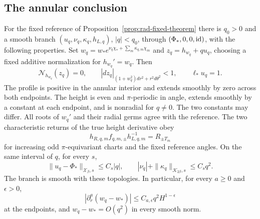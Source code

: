 \subsection{The annular conclusion}

\begin{theorem}
\label{thm:new-annular-height}
For the fixed reference of Proposition~\ref{prop:rad-fixed-theorem}
there is $q_0>0$ and a smooth branch
$(u_q,\nu_q,\kappa_q,h_{L,q})$, $|q|<q_0$, through
$(\Phi_*,0,0,\mathrm{id})$, with the following properties.
Set $w_q=w_*e^{\nu_q\chi_*+\sum_m\kappa_{q,m}\chi_m}$ and
$z_q=h_{w_q}+qu_q$, choosing a fixed additive normalization for
$h_{w_q}'=w_q$. Then
\[
 \mathcal N_{h_{w_q}}(z_q)=0,\qquad
 |dz_q|_{(1+w_q^2)dr^2+r^2d\theta^2}<1,\qquad \ell_*u_q=1.
\]
The profile is positive in the annular interior and extends smoothly
by zero across both endpoints. The height is even and $\pi$-periodic
in angle, extends smoothly by a constant at each endpoint, and is
nonradial for $q\ne0$. The two constants may differ.
All roots of $w_q'$ and their radial germs agree with the reference.
The two characteristic returns of the true height derivative obey
\begin{equation}\label{eq:annular-return-condition}
 h_{R,q,m}f_{q,m,\pm}h_{L,q,m}^{-1}=R_{\pm T_m}
\end{equation}
for increasing odd $\pi$-equivariant charts and the fixed reference angles.
On the same interval of $q$, for every $s$,
\begin{equation}\label{eq:annular-branch-estimates}
 \|u_q-\Phi_*\|_{\mathcal X_\beta,s}\le C_s|q|,\qquad
 |\nu_q|+\|\kappa_q\|_{\mathcal K_{2\beta},s}\le C_sq^2.
\end{equation}
The branch is smooth with these topologies. In particular, for
every $a\ge0$ and $\epsilon>0$,
\[
 |\partial_r^a(w_q-w_*)|\le C_{a,\epsilon}q^2H^{1-\epsilon}
\]
at the endpoints, and $w_q-w_*=O(q^2)$ in every smooth norm.
\end{theorem}

